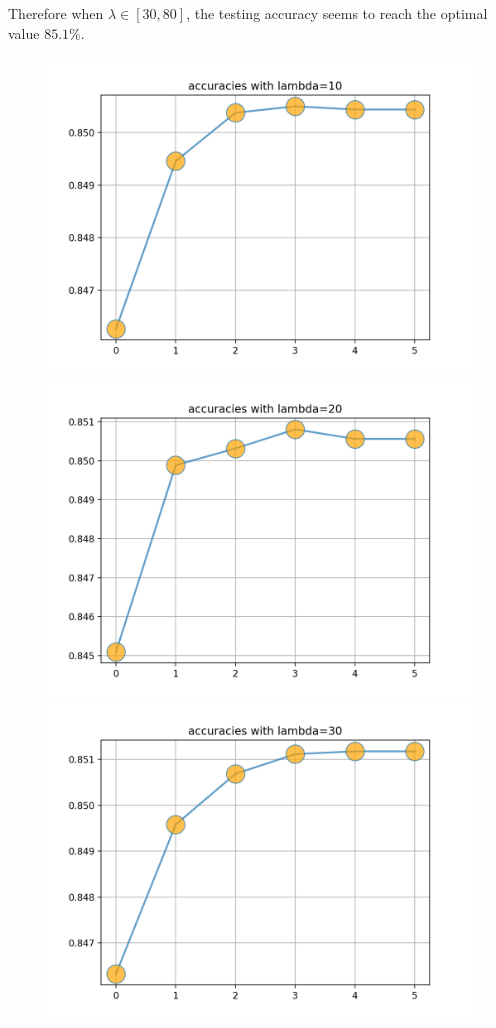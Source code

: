 \documentclass[12pt]{article}
\begin{document}
\newpage
Therefore when $\lambda\in[30,80]$, the testing accuracy seems to reach the optimal value $85.1\%$. 
\begin{figure}[ht]
\centering
\includegraphics[scale=0.47]{7.png}
\includegraphics[scale=0.47]{8.png}
\includegraphics[scale=0.47]{9.png}

\end{figure}
\end{document}
